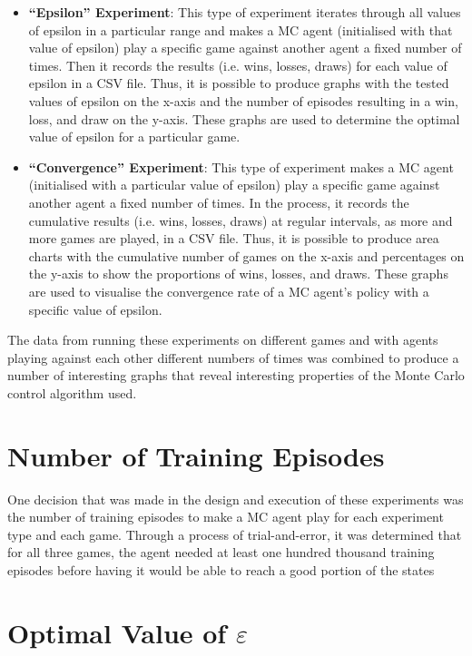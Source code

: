 \documentclass[11pt,a4paper]{report}
\begin{document}
\begin{itemize}

	\item \textbf{``Epsilon'' Experiment}: This type of experiment iterates through all values of epsilon in a particular range and makes a MC agent (initialised with that value of epsilon) play a specific game against another agent a fixed number of times. Then it records the results (i.e. wins, losses, draws) for each value of epsilon in a CSV file. Thus, it is possible to produce graphs with the tested values of epsilon on the x-axis and the number of episodes resulting in a win, loss, and draw on the y-axis. These graphs are used to determine the optimal value of epsilon for a particular game.

	\item \textbf{``Convergence'' Experiment}: This type of experiment makes a MC agent (initialised with a particular value of epsilon) play a specific game against another agent a fixed number of times. In the process, it records the cumulative results (i.e. wins, losses, draws) at regular intervals, as more and more games are played, in a CSV file. Thus, it is possible to produce area charts with the cumulative number of games on the x-axis and percentages on the y-axis to show the proportions of wins, losses, and draws. These graphs are used to visualise the convergence rate of a MC agent's policy with a specific value of epsilon.

\end{itemize}

The data from running these experiments on different games and with agents playing against each other different numbers of times was combined to produce a number of interesting graphs that reveal interesting properties of the Monte Carlo control algorithm used.


\section{Number of Training Episodes}

One decision that was made in the design and execution of these experiments was the number of training episodes to make a MC agent play for each experiment type and each game. Through a process of trial-and-error, it was determined that for all three games, the agent needed at least one hundred thousand training episodes before having it would be able to reach a good portion of the states


\section{Optimal Value of $\varepsilon$}
\end{document}
